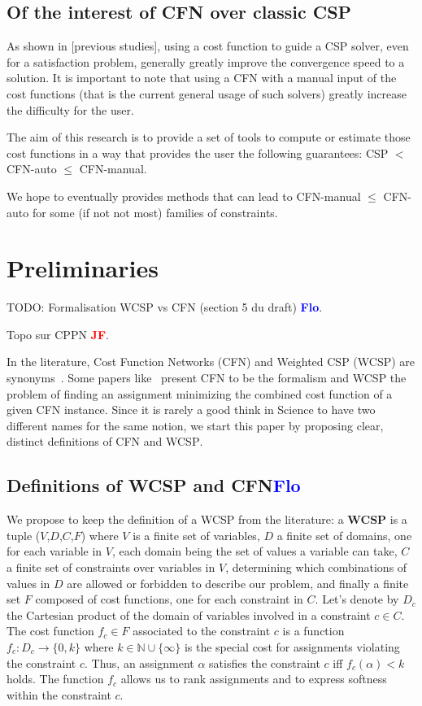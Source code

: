 \documentclass{article}
\newcommand{\csp}{\textsc{CSP}\xspace}
\newcommand{\cfn}{\textsc{CFN}\xspace}
\newcommand{\wcsp}{\textsc{WCSP}\xspace}
\newcommand{\flo}{\textcolor{blue}{\bf Flo}\xspace}
\newcommand{\jf}{\textcolor{red}{\bf JF}\xspace}
\begin{document}
\subsection{Of the interest of \cfn over classic CSP}
As shown in  [previous studies], using a cost function  to guide a CSP
solver, even for a satisfaction problem, generally greatly improve the
convergence speed to a solution.  It is important to note that using a
\cfn with  a manual input of  the cost functions (that  is the current
general usage of such solvers) greatly increase the difficulty for the
user.

The aim of  this research is to  provide a set of tools  to compute or
estimate those  cost functions  in a  way that  provides the  user the
following guarantees: CSP $<$ CFN-auto $\leq$ CFN-manual.

We hope  to eventually  provides methods that  can lead  to CFN-manual
$\leq$ CFN-auto for some (if not not most) families of constraints.

\section{Preliminaries}\label{sec:preliminaries}
TODO: Formalisation    WCSP     vs    CFN     (section    5     du
draft) \flo. \cite{Bessiere2011,LK2014}

Topo sur CPPN \jf \cite{CPPN}.

In the  literature, Cost  Function Networks  (\cfn) and  Weighted \csp
(\wcsp)  are  synonyms~\cite{Zytnicki2009,Bessiere2011}.  Some  papers
like~\cite{Allouche2012} present  \cfn to  be the formalism  and \wcsp
the  problem of  finding an  assignment minimizing  the combined  cost
function of a given \cfn instance. Since  it is rarely a good think in
Science to have two different names for the same notion, we start this
paper by proposing clear, distinct definitions of \cfn and \wcsp.

\subsection{Definitions of \wcsp and \cfn \flo} 

We propose  to keep the definition  of a \wcsp from  the literature: a
\textbf{\wcsp} is a tuple ($V$,$D$,$C$,$F$)  where $V$ is a finite set
of variables,  $D$ a finite set  of domains, one for  each variable in
$V$, each domain  being the set of  values a variable can  take, $C$ a
finite set  of constraints  over variables  in $V$,  determining which
combinations of values in $D$ are allowed or forbidden to describe our
problem, and finally a finite set  $F$ composed of cost functions, one
for  each constraint  in $C$.   Let's  denote by  $D_c$ the  Cartesian
product of  the domain of  variables involved  in a constraint  $c \in
C$. The cost function $f_c \in  F$ associated to the constraint $c$ is
a     function     $f_c:     D_c    \rightarrow     \{0,k\}$     where
$k \in \mathbb{N} \cup \{\infty\}$ is the special cost for assignments
violating the  constraint $c$. Thus, an  assignment $\alpha$ satisfies
the constraint  $c$ iff  $f_c(\alpha) < k$  holds. The  function $f_c$
allows  us to  rank assignments  and  to express  softness within  the
constraint $c$.
\end{document}
